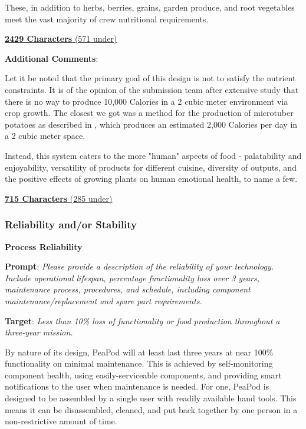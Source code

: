 \documentclass{report}
\begin{document}
These, in addition to herbs, berries, grains, garden produce, and root vegetables meet the vast majority of crew nutritional requirements.

\uline{\textbf{2429 Characters} (571 under)}

\vspace{0.5cm}

\textbf{Additional Comments}:

Let it be noted that the primary goal of this design is not to satisfy the nutrient constraints. It is of the opinion of the submission team after extensive study that there is no way to produce 10,000 Calories in a 2 cubic meter environment via crop growth. The closest we got was a method for the production of microtuber potatoes as described in \cite{minituber}, which produces an estimated 2,000 Calories per day in a 2 cubic meter space.

Instead, this system caters to the more "human" aspects of food - palatability and enjoyability, versatility of products for different cuisine, diversity of outputs, and the positive effects of growing plants on human emotional health, to name a few.

\uline{\textbf{715 Characters} (285 under)}

\newpage

\subsubsection{Reliability and/or Stability}

\textbf{Process Reliability}
\label{sec:reliability-process}

\textbf{Prompt}: \textit{Please provide a description of the reliability of your technology. Include operational lifespan, percentage functionality loss over 3 years, maintenance process, procedures, and schedule, including component maintenance/replacement and spare part requirements.}

\textbf{Target}: \textit{Less than 10\% loss of functionality or food production throughout a three-year mission.}


By nature of its design, PeaPod will at least last three years at near 100\% functionality on minimal maintenance. This is achieved by self-monitoring component health, using easily-serviceable components, and providing smart notifications to the user when maintenance is needed.
For one, PeaPod is designed to be assembled by a single user with readily available hand tools. This means it can be disassembled, cleaned, and put back together by one person in a non-restrictive amount of time.
\end{document}
